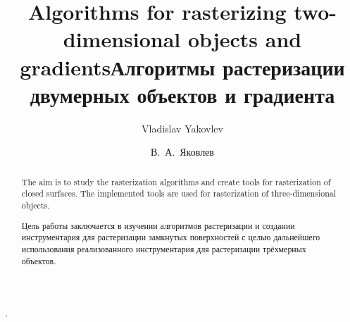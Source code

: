 \begin{englishtitle}
\title{Algorithms for rasterizing two-dimensional objects and gradients}
\author{Vladislav Yakovlev}

\maketitle

\begin{abstract}
The aim is to study the rasterization algorithms and create  tools for rasterization of closed surfaces. The implemented tools are used for rasterization of three-dimensional objects.

\end{abstract}
\end{englishtitle}


\iffalse
\documentclass[12pt]{llncs}
\usepackage[T2A]{fontenc}
\usepackage[utf8]{inputenc}
\usepackage[english,russian]{babel}
\usepackage[russian]{nla}




\fi

\title{Алгоритмы растеризации двумерных объектов и градиента%
}
\author{В.~А.~Яковлев%
} 
.

\maketitle

\begin{abstract}
Цель работы заключается в изучении алгоритмов растеризации и создании инструментария для растеризации замкнутых поверхностей с целью дальнейшего использования реализованного инструментария для растеризации трёхмерных объектов. %

\end{abstract}

